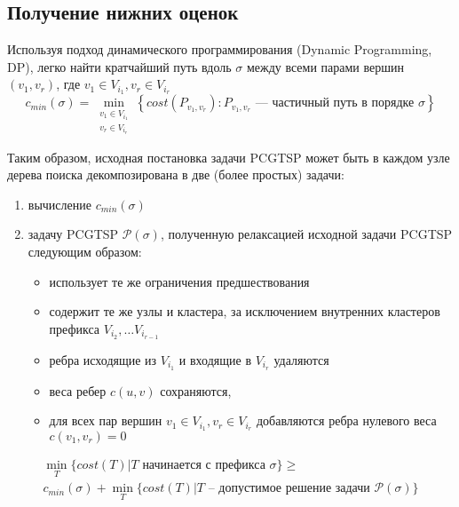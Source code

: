 
\subsection{Получение нижних оценок}
\label{sec:pgstcp.bound}

Используя подход динамического программирования
(Dynamic Programming, DP),
легко найти кратчайший путь
вдоль $\sigma$
между всеми парами вершин
$(v_1, v_r)$,
где
$v_1\in V_{i_1}, v_r\in V_{i_r}$
\begin{equation}
  \label{eq:pcgtsp.Cmin}
  c_{min}(\sigma)=\min_{\substack{v_1\in V_{i_1} \\ v_r\in V_{i_r}} } \left\{
    cost \left(P_{v_1, v_r}\right) \colon
    P_{v_1, v_r} \text{ --- частичный путь в порядке } \sigma \right\}
\end{equation}

Таким образом, исходная постановка задачи PCGTSP
может быть в каждом узле дерева поиска декомпозирована в две
(более простых) задачи:
\begin{enumerate}
  \item вычисление $c_{min}(\sigma)$
  \item задачу PCGTSP $\mathcal P(\sigma)$, полученную релаксацией исходной задачи PCGTSP следующим образом:
  \begin{itemize}
    \item использует те же ограничения предшествования
    \item содержит те же узлы и кластера,
    за исключением внутренних кластеров префикса
    $V_{i_2}, \dots V_{i_{r-1}}$
    \item ребра исходящие из $V_{i_1}$
    и входящие в $V_{i_r}$ удаляются
    \item веса ребер $c(u,v)$ сохраняются,
    \item для всех пар вершин
    $v_1\in V_{i_1}, v_r\in V_{i_r}$
    добавляются ребра нулевого веса
    $c(v_1, v_r)=0$
  \end{itemize}
\end{enumerate}

\begin{proposition}
\begin{multline}
  \label{eq:pcgtsp.decomposition}
  \min_T \{cost(T)| T \text{ начинается с префикса } \sigma\}
  \geqslant \\
  c_{min}(\sigma) + \min_{T}\{cost(T)| T \text{ -- допустимое решение задачи } \mathcal P(\sigma)\}
\end{multline}
\end{proposition}

